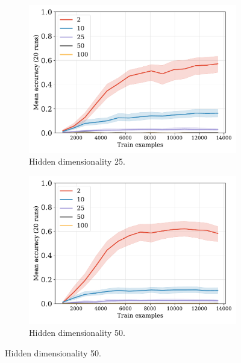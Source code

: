 \documentclass[12pt]{article}
\begin{document}
\begin{figure}[H]
  \begin{subfigure}{0.45\linewidth}
    \includegraphics[width=1\textwidth]{fig/fuzzy-lm-vocab10-train_size-embed_dim-hidden_dim=25.pdf}
    \caption{Hidden dimensionality 25.}
  \end{subfigure}
  \hfill
  \begin{subfigure}{0.45\linewidth}
    \includegraphics[width=1\textwidth]{fig/fuzzy-lm-vocab10-train_size-embed_dim-hidden_dim=50.pdf}
    \caption{Hidden dimensionality 50.}
  \end{subfigure}


\end{figure}
\end{document}
